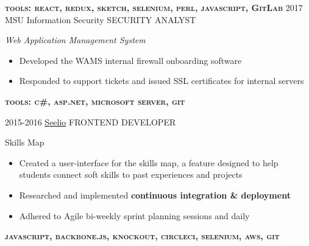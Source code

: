 \documentclass[]{friggeri-cv}
\begin{document}
\begin{entrylist}
{    \textbf{\textsc{tools: react, redux, sketch, selenium, perl, javascript, GitLab}}
    \vspace{10pt}
  }
\entry
  {2017}
  {\textcolor{gray}{\FA \faLock} MSU Information Security}
  {SECURITY ANALYST}
  {
    \textit{Web Application Management System}
    \begin{itemize}[topsep=6pt,leftmargin=0pt,itemsep=6pt]
      \item Developed the WAMS internal firewall onboarding software %
      \item Responded to support tickets and issued SSL certificates for internal servers 
    \end{itemize}
    \textbf{\textsc{tools: c\#, asp.net, microsoft server, git}}
    \vspace{10pt}
  }
\entry
  {2015-2016}
  {\textcolor{gray}{\FA \faMapMarker} \href{http://www.seelio.com/}{Seelio} }
  {FRONTEND DEVELOPER}
  {
    Skills Map
    \begin{itemize}[topsep=6pt,leftmargin=0pt,itemsep=6pt]
      \item Created a user-interface for the skills map, a feature designed
        to help students connect soft skills to past experiences and projects
      \item {
          Researched and implemented {\bfseries continuous integration \& deployment} %
        }
      \item Adhered to Agile bi-weekly sprint planning sessions and daily 
    \end{itemize}
    \textbf{\textsc{javascript, backbone.js, knockout, circleci, selenium, aws, git}}
    \vspace{10pt}
  }


\end{entrylist}
\end{document}
